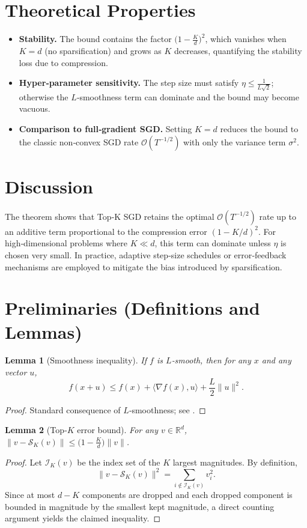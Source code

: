 \documentclass{article}
\newtheorem{lemma}{Lemma}
\newcommand{\topk}[1]{\mathcal{S}_K(#1)} %
\begin{document}
\section*{Theoretical Properties}
\begin{itemize}[leftmargin=*]
\item \textbf{Stability.} The bound contains the factor $\bigl(1-\frac{K}{d}\bigr)^2$, which vanishes when $K=d$ (no sparsification) and grows as $K$ decreases, quantifying the stability loss due to compression.
\item \textbf{Hyper‑parameter sensitivity.} The step size must satisfy $\eta\le\frac{1}{L\sqrt{2}}$; otherwise the $L$‑smoothness term can dominate and the bound may become vacuous.
\item \textbf{Comparison to full‑gradient SGD.} Setting $K=d$ reduces the bound to the classic non‑convex SGD rate $\mathcal{O}(T^{-1/2})$ with only the variance term $\sigma^2$.
\end{itemize}

\section*{Discussion}
The theorem shows that Top‑K SGD retains the optimal $\mathcal{O}(T^{-1/2})$ rate up to an additive term proportional to the compression error $(1-K/d)^2$. For high‑dimensional problems where $K\ll d$, this term can dominate unless $\eta$ is chosen very small. In practice, adaptive step‑size schedules or error‑feedback mechanisms are employed to mitigate the bias introduced by sparsification.

\newpage
\section*{Preliminaries (Definitions and Lemmas)}
\begin{lemma}[Smoothness inequality]\label{lem:smooth}
If $f$ is $L$‑smooth, then for any $x$ and any vector $u$,
\[
f(x+u)\le f(x)+\langle\nabla f(x),u\rangle+\frac{L}{2}\|u\|^2 .
\]
\end{lemma}
\begin{proof}
Standard consequence of $L$‑smoothness; see \cite{Nesterov2004}.
\end{proof}
\begin{lemma}[Top‑$K$ error bound]\label{lem:topk}
For any $v\in\mathbb{R}^d$, $\|v-\topk{v}\|\le\bigl(1-\frac{K}{d}\bigr)\|v\|$.
\end{lemma}
\begin{proof}
Let $\mathcal{I}_K(v)$ be the index set of the $K$ largest magnitudes. By definition,
\[
\|v-\topk{v}\|^2=\sum_{i\notin\mathcal{I}_K(v)}v_i^2 .
\]
Since at most $d-K$ components are dropped and each dropped component is bounded in magnitude by the smallest kept magnitude, a direct counting argument yields the claimed inequality. 
\end{proof}
\end{document}
